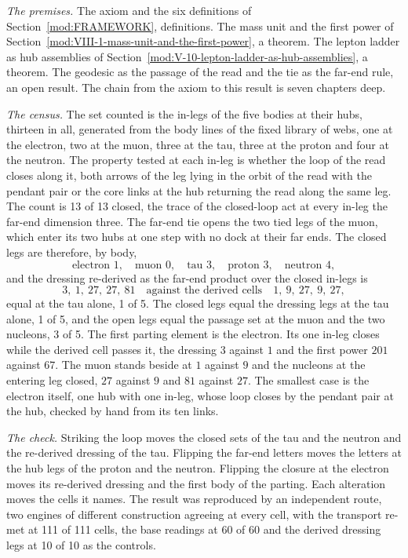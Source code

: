 \begin{chproof}
\textit{The premises.} The axiom and the six definitions of Section~\ref{mod:FRAMEWORK}, definitions. The mass unit and the first power of Section~\ref{mod:VIII-1-mass-unit-and-the-first-power}, a theorem. The lepton ladder as hub assemblies of Section~\ref{mod:V-10-lepton-ladder-as-hub-assemblies}, a theorem. The geodesic as the passage of the read and the tie as the far-end rule, an open result. The chain from the axiom to this result is seven chapters deep.

\textit{The census.} The set counted is the in-legs of the five bodies at their hubs, thirteen in all, generated from the body lines of the fixed library of webs, one at the electron, two at the muon, three at the tau, three at the proton and four at the neutron. The property tested at each in-leg is whether the loop of the read closes along it, both arrows of the leg lying in the orbit of the read with the pendant pair or the core links at the hub returning the read along the same leg. The count is 13 of 13 closed, the trace of the closed-loop act at every in-leg the far-end dimension three. The far-end tie opens the two tied legs of the muon, which enter its two hubs at one step with no dock at their far ends. The closed legs are therefore, by body,
\begin{equation}
\text{electron } 1,\quad \text{muon } 0,\quad \text{tau } 3,\quad \text{proton } 3,\quad \text{neutron } 4 ,
\end{equation}
and the dressing re-derived as the far-end product over the closed in-legs is
\begin{equation}
3,\ 1,\ 27,\ 27,\ 81 \quad\text{against the derived cells}\quad 1,\ 9,\ 27,\ 9,\ 27 ,
\end{equation}
equal at the tau alone, 1 of 5. The closed legs equal the dressing legs at the tau alone, 1 of 5, and the open legs equal the passage set at the muon and the two nucleons, 3 of 5. The first parting element is the electron. Its one in-leg closes while the derived cell passes it, the dressing $3$ against $1$ and the first power $201$ against $67$. The muon stands beside at $1$ against $9$ and the nucleons at the entering leg closed, $27$ against $9$ and $81$ against $27$. The smallest case is the electron itself, one hub with one in-leg, whose loop closes by the pendant pair at the hub, checked by hand from its ten links.

\textit{The check.} Striking the loop moves the closed sets of the tau and the neutron and the re-derived dressing of the tau. Flipping the far-end letters moves the letters at the hub legs of the proton and the neutron. Flipping the closure at the electron moves its re-derived dressing and the first body of the parting. Each alteration moves the cells it names. The result was reproduced by an independent route, two engines of different construction agreeing at every cell, with the transport re-met at 111 of 111 cells, the base readings at 60 of 60 and the derived dressing legs at 10 of 10 as the controls.
\end{chproof}
